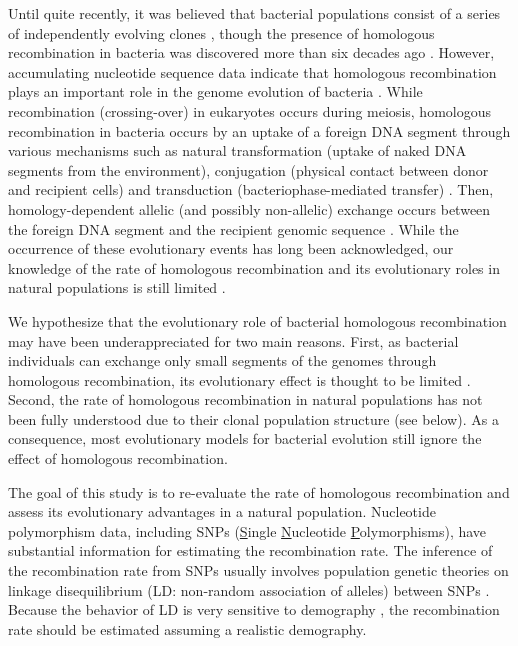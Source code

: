 \documentclass[twoside,twocolumn, letterpaper]{article}
\begin{document}
\vspace{6mm}




\noindent Until quite recently, it was believed that bacterial populations consist of a series of independently evolving clones \cite[]{Selander_1980_56,Orskov_1983,Hartl_1984_47,Smith_1993_8506277}, though the presence of homologous recombination in bacteria was discovered more than six decades ago \cite[]{LEDERBERG_1946_63,Lederberg_1947_17247259}. However, accumulating nucleotide sequence data indicate that homologous recombination plays an important role in the genome evolution of bacteria \cite[]{Feil_2001_11544367,Falush_2009_19855823}. While recombination (crossing-over) in eukaryotes occurs during meiosis, homologous recombination in bacteria occurs by an uptake of a foreign DNA segment through various mechanisms such as natural transformation (uptake of naked DNA segments from the environment), conjugation (physical contact between donor and recipient cells) and transduction (bacteriophase-mediated transfer) \cite[]{Whittan93,Ochman_2000_10830951,Errington_2001_11433368}. Then, homology-dependent allelic (and possibly non-allelic) exchange occurs between the foreign DNA segment and the recipient genomic sequence \cite[]{Levin88,Rayssiguier_1989_55,Whittan93}. While the occurrence of these evolutionary events has long been acknowledged, our knowledge of the rate of homologous recombination and its evolutionary roles in natural populations is still limited \cite[]{Vos_2009_19464181}.


 We hypothesize that the evolutionary role of bacterial homologous recombination may have been underappreciated for two main 
 reasons. First, as bacterial individuals can exchange only small segments of the genomes through homologous recombination, its evolutionary effect is thought to be limited \cite[]{MaynardSmith_1991_1985260}. Second, the rate of homologous recombination in natural populations has not been fully understood due to their clonal population structure (see below). As a consequence, most evolutionary models for bacterial evolution still ignore the effect of homologous recombination. 

The goal of this study is to re-evaluate the rate of homologous recombination and assess its evolutionary advantages in a natural population.
 Nucleotide polymorphism data, including SNPs (\underline{S}ingle \underline{N}ucleotide \underline{P}olymorphisms), have substantial information for estimating the recombination rate. The inference of the recombination rate from SNPs usually involves population genetic theories on linkage disequilibrium (LD: non-random association of alleles) between SNPs \cite[]{Stumpf_2003_14631356}. Because the behavior of LD is very sensitive to demography \cite[]{Ohta_1982_17246079,Slatkin_1994_8056320,Kruglyak_1999_10369254,McVean_2002_12399406,Stumpf_2003_14631356,Slatkin_2008_18427557}, the recombination rate should be estimated assuming a realistic demography. 
\end{document}
